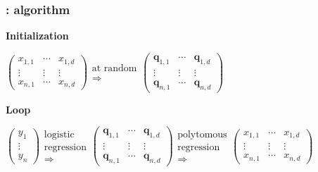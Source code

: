 \documentclass[english,xcolor={rgb,dvipsnames,table,usenames}]{beamer}
\newcommand\q{{\bm{q}}}
\begin{document}
\begin{frame}
\frametitle{\subsecname: algorithm}

\tiny


\textbf{Initialization}


\medskip

$\left( \begin{array}{ccc}
x_{1,1} & \cdots & x_{1,d}  \\
 \vdots & \vdots & \vdots \\
 x_{n,1} & \cdots & x_{n,d} \end{array} \right)
\begin{array}{c}
\text{at random} \\
\Rightarrow \end{array}
\left( \begin{array}{ccc}
\q_{1,1} & \cdots & \q_{1,d}  \\
 \vdots & \vdots & \vdots \\
 \q_{n,1} & \cdots & \q_{n,d} \end{array} \right)$

\medskip

\textbf{Loop}

\medskip

$\left( \begin{array}{c}
y_1 \\
\vdots \\
y_n \end{array} \right)
\begin{array}{c}
\text{logistic} \\
\text{regression} \\
\Rightarrow \end{array}
\left( \begin{array}{ccc}
\q_{1,1} & \cdots & \q_{1,d}  \\
 \vdots & \vdots & \vdots \\
 \q_{n,1} & \cdots & \q_{n,d} \end{array} \right)
\begin{array}{c}
\text{polytomous} \\
\text{regression} \\
\Rightarrow \end{array}
\left( \begin{array}{ccc}
x_{1,1} & \cdots & x_{1,d}  \\
 \vdots & \vdots & \vdots \\
 x_{n,1} & \cdots & x_{n,d} \end{array} \right)
$


\end{frame}
\end{document}
